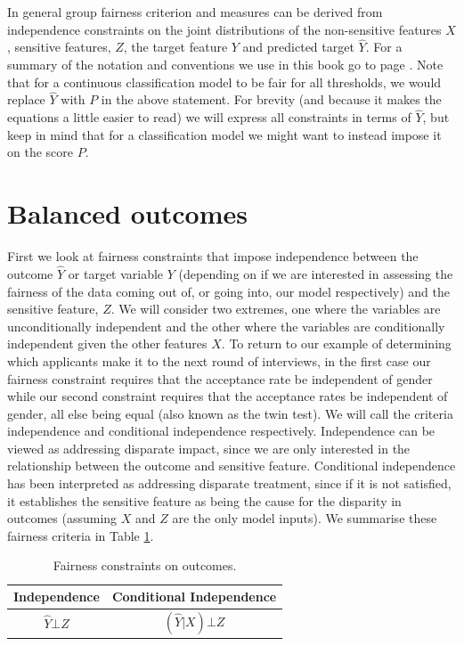 In general group fairness criterion and measures can be derived from independence constraints on the joint distributions of the non-sensitive features $X$, sensitive features, $Z$, the target feature $Y$ and predicted target $\hat{Y}$. For a summary of the notation and conventions we use in this book go to page \pageref{ch_Notation}. Note that for a continuous classification model to be fair for all thresholds, we would replace $\hat{Y}$ with $P$ in the above statement. For brevity (and because it makes the equations a little easier to read) we will express all constraints in terms of $\hat{Y}$, but keep in mind that for a classification model we might want to instead impose it on the score $P$.

\section{Balanced outcomes} \label{sec_BalOut}

First we look at fairness constraints that impose independence between the outcome $\hat{Y}$ or target variable $Y$ (depending on if we are interested in assessing the fairness of the data coming out of, or going into, our model respectively) and the sensitive feature, $Z$. We will consider two extremes, one where the variables are unconditionally independent and the other where the variables are conditionally independent given the other features $X$. To return to our example of determining which applicants make it to the next round of interviews, in the first case our fairness constraint requires that the acceptance rate be independent of gender while our second constraint requires that the acceptance rates be independent of gender, all else being equal (also known as the twin test). We will call the criteria independence and conditional independence respectively. Independence can be viewed as addressing disparate impact, since we are only interested in the relationship between the outcome and sensitive feature. Conditional independence has been interpreted as addressing disparate treatment, since if it is not satisfied, it establishes the sensitive feature as being the cause for the disparity in outcomes (assuming $X$ and $Z$ are the only model inputs). We summarise these fairness criteria in Table \ref{tab_FairOutcomes}.
%
\begin{table}[h!]
\centering
\caption{Fairness constraints on outcomes.}
\label{tab_FairOutcomes}
\vspace{10pt}
\begin{tabular}{|c|c|}
\hline
Independence     & Conditional Independence \\
\hline
\hline
$\hat{Y} \bot Z$ & $(\hat{Y} | X) \bot Z$   \\
\hline
\end{tabular}
\end{table}

